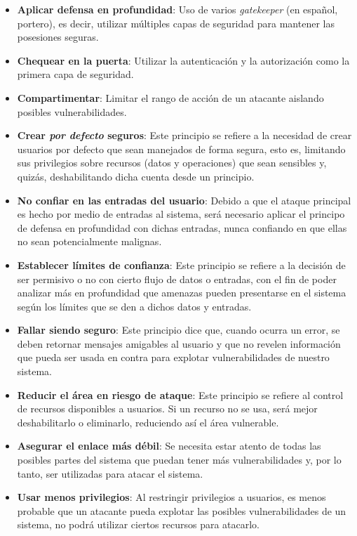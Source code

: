 \begin{itemize}
 \item \textbf{Aplicar defensa en profundidad}: Uso de varios \textit{gatekeeper} (en español, portero), es decir, utilizar múltiples capas de seguridad para mantener las posesiones seguras.
 \item \textbf{Chequear en la puerta}: Utilizar la autenticación y la autorización como la primera capa de seguridad.
 \item \textbf{Compartimentar}: Limitar el rango de acción de un atacante aislando posibles vulnerabilidades.
 \item \textbf{Crear \textit{por defecto} seguros}: Este principio se refiere a la necesidad de crear usuarios por defecto que sean manejados de forma segura, esto es, limitando sus privilegios sobre recursos (datos y operaciones) que sean sensibles y, quizás, deshabilitando dicha cuenta desde un principio.
 \item \textbf{No confiar en las entradas del usuario}: Debido a que el ataque principal es hecho por medio de entradas al sistema, será necesario aplicar el principo de defensa en profundidad con dichas entradas, nunca confiando en que ellas no sean potencialmente malignas.
 \item \textbf{Establecer límites de confianza}: Este principio se refiere a la decisión de ser permisivo o no con cierto flujo de datos o entradas, con el fin de poder analizar más en profundidad que amenazas pueden presentarse en el sistema según los límites que se den a dichos datos y entradas.
 \item \textbf{Fallar siendo seguro}: Este principio dice que, cuando ocurra un error, se deben retornar mensajes amigables al usuario y que no revelen información que pueda ser usada en contra para explotar vulnerabilidades de nuestro sistema.
 \item \textbf{Reducir el área en riesgo de ataque}: Este principio se refiere al control de recursos disponibles a usuarios. Si un recurso no se usa, será mejor deshabilitarlo o eliminarlo, reduciendo así el área vulnerable.
 \item \textbf{Asegurar el enlace más débil}: Se necesita estar atento de todas las posibles partes del sistema que puedan tener más vulnerabilidades y, por lo tanto, ser utilizadas para atacar el sistema.
 \item \textbf{Usar menos privilegios}: Al restringir privilegios a usuarios, es menos probable que un atacante pueda explotar las posibles vulnerabilidades de un sistema, no podrá utilizar ciertos recursos para atacarlo.
\end{itemize}